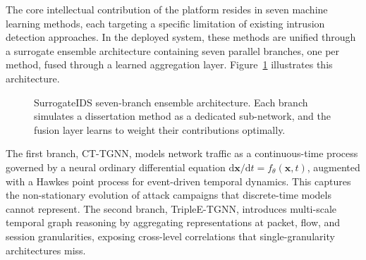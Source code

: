 \documentclass[11pt,a4paper]{article}
\begin{document}
The core intellectual contribution of the platform resides in seven machine
learning methods, each targeting a specific limitation of existing intrusion
detection approaches. In the deployed system, these methods are unified
through a surrogate ensemble architecture containing seven parallel
branches, one per method, fused through a learned aggregation layer.
Figure~\ref{fig:surrogate} illustrates this architecture.

\begin{figure}[H]
\centering
{}
\caption{SurrogateIDS seven-branch ensemble architecture. Each branch
simulates a dissertation method as a dedicated sub-network, and the fusion
layer learns to weight their contributions optimally.}
\label{fig:surrogate}
\end{figure}

The first branch, CT-TGNN, models network traffic as a continuous-time
process governed by a neural ordinary differential equation
$\mathrm{d}\mathbf{x}/\mathrm{d}t = f_\theta(\mathbf{x}, t)$, augmented
with a Hawkes point process for event-driven temporal dynamics. This
captures the non-stationary evolution of attack campaigns that discrete-time
models cannot represent. The second branch, TripleE-TGNN, introduces
multi-scale temporal graph reasoning by aggregating representations at
packet, flow, and session granularities, exposing cross-level correlations
that single-granularity architectures miss.
\end{document}
